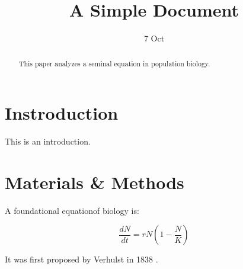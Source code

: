 \documentclass[12pt]{article}
\title{A Simple Document}
\date{7 Oct}
\begin{document}
    \maketitle

    \begin{abstract}
        This paper analyzes a seminal equation in population biology.
    \end{abstract}

    \section{Instroduction}
        This is an introduction.
    
    \section{Materials \& Methods}

    A foundational equationof biology is:

    \begin{equation}
        \frac{dN}{dt} = r N (1 - \frac{N}{K})
    \end{equation}

    It was first proposed by Verhulst in 1838 \cite{verhulst1838notice}.
    
    

\end{document}
